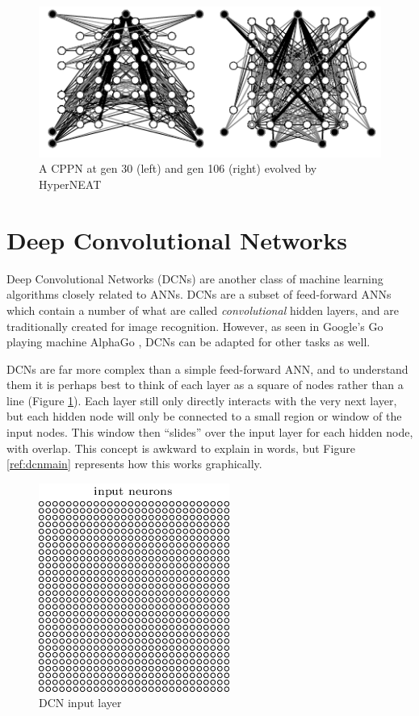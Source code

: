 \begin{figure}[!h!]
\centering
\includegraphics[scale=0.55]{images/hyperneatnets.png}
\caption{A CPPN at gen 30 (left) and gen 106 (right) evolved by HyperNEAT \cite{hyperpic}}
\end{figure}

\section{Deep Convolutional Networks}
Deep Convolutional Networks (DCNs) are another class of machine learning algorithms closely related to ANNs.  DCNs are a subset of feed-forward ANNs which contain a number of what are called \textit{convolutional} hidden layers, and are traditionally created for image recognition.  However, as seen in Google's Go playing machine AlphaGo \cite{alphago}, DCNs can be adapted for other tasks as well.

DCNs are far more complex than a simple feed-forward ANN, and to understand them it is perhaps best to think of each layer as a square of nodes rather than a line (Figure \ref{ref:dcn1}).  Each layer still only directly interacts with the very next layer, but each hidden node will only be connected to a small region or window of the input nodes.  This window then ``slides'' over the input layer for each hidden node, with overlap.  This concept is awkward to explain in words, but Figure \ref{ref:dcnmain} represents how this works graphically.

\begin{figure}[h]
\centering
\includegraphics[scale=0.5]{images/dcn1.png}
\caption{DCN input layer \cite{handwriting}}
\label{ref:dcn1}
\end{figure}

